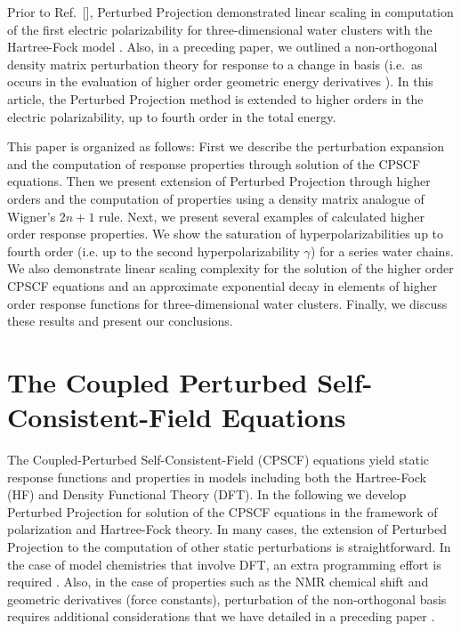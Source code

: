 \documentclass[prl,twocolumn,showpacs,twocolumngrid,superbib]{revtex4}
\begin{document}
Prior to Ref.~[], Perturbed Projection demonstrated linear scaling in 
computation of the first electric polarizability for three-dimensional water clusters with the 
Hartree-Fock model \cite{VWeber04}. Also, in a preceding paper, we outlined a non-orthogonal density matrix
perturbation theory \cite{ANiklasson05a} for response to a change in basis (i.e.~as occurs in 
the evaluation of higher order geometric energy derivatives \cite{RAmos89}). 
In this article, the Perturbed Projection method is extended to higher orders
in the electric polarizability, up to fourth order in the total energy.  

This paper is organized as follows: First we describe the perturbation expansion and 
the computation of response properties through solution of the CPSCF equations.
Then we present extension of Perturbed Projection through higher orders and the 
computation of properties using a density matrix analogue of Wigner's $2 n+1$ rule.
Next,  we present several examples of calculated higher order response properties.
We show the saturation of hyperpolarizabilities up to  fourth order (i.e. up to the 
second hyperpolarizability $\gamma$) for a series water chains.
We also  demonstrate linear scaling complexity for the solution of the higher order CPSCF
equations and an approximate exponential decay in elements of higher order response functions
for three-dimensional water clusters.  Finally, we discuss these results and present our conclusions. 

\section{The Coupled Perturbed Self-Consistent-Field Equations}

The Coupled-Perturbed Self-Consistent-Field (CPSCF) equations yield
static response functions and properties in models including both the 
Hartree-Fock (HF) and Density Functional Theory (DFT).  In the following
we develop Perturbed Projection for solution of the CPSCF equations in the framework of polarization and 
Hartree-Fock theory.  In many cases, the extension of Perturbed Projection to
the computation of other static perturbations is straightforward.  In
the case of model chemistries that involve DFT, an extra programming effort is required \cite{ALee94,PSalek02}.
Also, in the case of properties such as the NMR chemical shift and geometric derivatives 
(force constants), perturbation of the non-orthogonal basis requires additional 
considerations that we have detailed in a preceding paper \cite{ANiklasson05a}.
\end{document}
